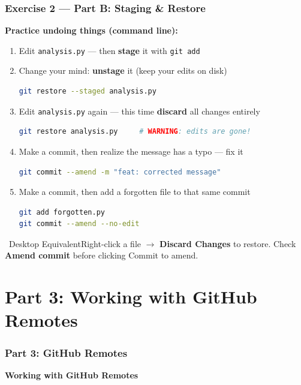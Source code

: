 \documentclass{beamer}
\newcommand{\desktoptip}[1]{\begin{block}{\faMousePointer\ Desktop Equivalent}#1\end{block}}
\begin{document}
\begin{frame}[fragile]
\frametitle{Exercise 2 --- Part B: Staging \& Restore}
\textbf{Practice undoing things (command line):}
\begin{enumerate}
    \item Edit \texttt{analysis.py} --- then \textbf{stage} it with \texttt{git add}
    \item Change your mind: \textbf{unstage} it (keep your edits on disk)
    \begin{lstlisting}[language=bash]
git restore --staged analysis.py
    \end{lstlisting}
    \item Edit \texttt{analysis.py} again --- this time \textbf{discard} all changes entirely
    \begin{lstlisting}[language=bash]
git restore analysis.py     # WARNING: edits are gone!
    \end{lstlisting}
    \item Make a commit, then realize the message has a typo --- fix it
    \begin{lstlisting}[language=bash]
git commit --amend -m "feat: corrected message"
    \end{lstlisting}
    \item Make a commit, then add a forgotten file to that same commit
    \begin{lstlisting}[language=bash]
git add forgotten.py
git commit --amend --no-edit
    \end{lstlisting}
\end{enumerate}
\desktoptip{Right-click a file $\rightarrow$ \textbf{Discard Changes} to restore. Check \textbf{Amend commit} before clicking Commit to amend.}
\end{frame}

\section{Part 3: Working with GitHub Remotes}

\begin{frame}
\frametitle{Part 3: GitHub Remotes}
\centering
\Large \textbf{Working with GitHub Remotes}\\[6pt]
\end{frame}
\end{document}

